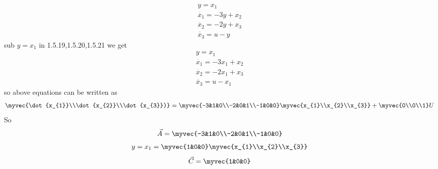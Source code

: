 \begin{enumerate}[label=\thesubsection.\arabic*.,ref=\thesubsection.\theenumi]
\begin{align}
y=x_{1}\\
\dot{x_{1}}=-3y+x_{2}\\
\dot{x_{2}}=-2y+x_{3}\\
\dot{x_{3}}=u-y
\end{align} 
sub $ y=x_{1}$ in 1.5.19,1.5.20,1.5.21 we get
\begin{align}
 y=x_{1}\\
\dot{x_{1}}=-3x_{1}+x_{2}\\
\dot{x_{2}}=-2x_{1}+x_{3}\\
\dot{x_{3}}=u-x_{1}
\end{align} 
so above equations can be written as
\begin{align}
\myvec{\dot{x_{1}}\\\dot{x_{2}}\\\dot{x_{3}})}
=
\myvec{-3&1&0\\-2&0&1\\-1&0&0}\myvec{x_{1}\\x_{2}\\x_{3}}
+
\myvec{0\\0\\1}  U
\end{align}
So 
\begin{align}
\vec{A}=\myvec{-3&1&0\\-2&0&1\\-1&0&0}
\end{align}
\begin{align}
y=x_{1}
=\myvec{1&0&0} \myvec{x_{1}\\x_{2}\\x_{3}}
\end{align}
\begin{align}
\vec{C}=\myvec{1&0&0}
\end{align}



\end{enumerate}

